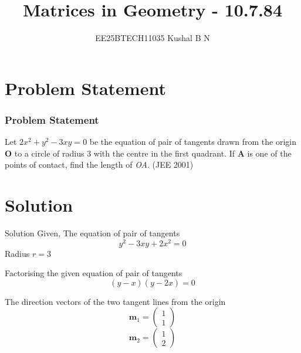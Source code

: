 \documentclass{beamer}
\title{Matrices in Geometry - 10.7.84}
\author{EE25BTECH11035 Kushal B N}
\date{}
\let\vec\mathbf
\theoremstyle{remark}
\newcommand{\myvec}[1]{\ensuremath{\begin{pmatrix}#1\end{pmatrix}}}
\begin{document}
\maketitle

\section{Problem Statement}
\begin{frame}
\frametitle{Problem Statement}
Let $2x^2 + y^2 - 3xy = 0$ be the equation of pair of tangents drawn from the origin $\vec{O}$ to a circle of radius 3 with the centre in the first quadrant. If $\vec{A}$ is one of the points of contact, find the length of \textit{OA}.
\hfill (JEE 2001)
\end{frame}

\section{Solution}
\begin{frame}{Solution}
Given,
The equation of pair of tangents
\begin{equation}
    y^2 - 3xy + 2x^2 = 0
\end{equation}
Radius $r = 3$

Factorising the given equation of pair of tangents
\begin{equation}
    (y-x)(y-2x) = 0
\end{equation}

The direction vectors of the two tangent lines from the origin 
\begin{equation}
    \vec{m}_1 = \myvec{1\\1}
\end{equation}
\begin{equation}
    \vec{m}_2 = \myvec{1\\2}
\end{equation}
\end{frame}
\end{document}
